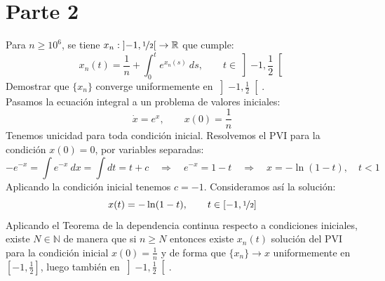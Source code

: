 \section{Parte 2}

\begin{ejercicio} %
    Para $n\geq 10^6$, se tiene $x_n:\left]-1,\nicefrac{1}{2}\right[\to \mathbb{R}$ que cumple:
    \begin{equation*}
        x_n(t) = \frac{1}{n} + \int_{0}^{t} e^{x_n(s)}~ds , \qquad t\in \left]-1,\frac{1}{2}\right[
    \end{equation*}
    Demostrar que $\{x_n\}$ converge uniformemente en $\left]-1,\frac{1}{2}\right[$.\\

    \noindent
    Pasamos la ecuación integral a un problema de valores iniciales:
    \begin{equation*}
        \dot{x} = e^x, \qquad x(0) = \frac{1}{n}
    \end{equation*}
    Tenemos unicidad para toda condición inicial. Resolvemos el PVI para la condición $x(0) = 0$, por variables separadas:
    \begin{equation*}
        -e^{-x} = \int e^{-x}~dx = \int dt = t + c \quad\Longrightarrow\quad e^{-x} = 1-t \quad\Longrightarrow\quad x = -\ln(1-t), \quad t<1
    \end{equation*}
    Aplicando la condición inicial tenemos $c = -1$. Consideramos así la solución:
    \begin{equation*}
        x(t) = -\ln(1-t), \qquad t\in [-1,\nicefrac{1}{2}]
    \end{equation*}
    Aplicando el Teorema de la dependencia continua respecto a condiciones iniciales, existe $N\in \mathbb{N}$ de manera que si $n\geq N$ entonces existe $x_n(t)$ solución del PVI para la condición inicial $x(0) = \frac{1}{n}$ y de forma que $\{x_n\}\to x$ uniformemente en $[-1,\frac{1}{2}]$, luego también en $\left]-1,\frac{1}{2}\right[$.
\end{ejercicio}

